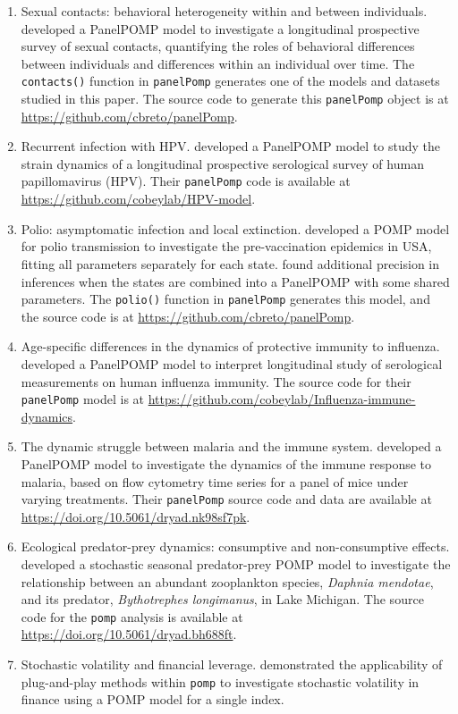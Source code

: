 \documentclass[12pt]{article}\usepackage[]{graphicx}\usepackage[table]{xcolor}
\newcommand\code{\texttt}
\newcommand\panelPomp{\texttt{panelPomp}\xspace}
\newcommand\pomp{\texttt{pomp}\xspace}
\newcommand\example[1]{ \item #1}
\begin{document}
\begin{enumerate}
\example{Sexual contacts: behavioral heterogeneity within and between individuals}.
\citet{romero-severson15} developed a PanelPOMP model to investigate a longitudinal prospective survey of sexual contacts, quantifying the roles of behavioral differences between individuals and differences within an individual over time. The \code{contacts()} function in \panelPomp generates one of the models and datasets studied in this paper. The source code to generate this \code{panelPomp} object is at \url{https://github.com/cbreto/panelPomp}.


\example{Recurrent infection with HPV}.
\citet{ranjeva17} developed a PanelPOMP model to study the strain dynamics of a longitudinal prospective serological survey of human papillomavirus (HPV).
Their \panelPomp code is available at \url{https://github.com/cobeylab/HPV-model}.

\example{Polio: asymptomatic infection and local extinction}.
\citet{martinez-bakker15} developed a POMP model for polio transmission to investigate the pre-vaccination epidemics in USA, fitting all parameters separately for each state.
\citet{breto19} found additional precision in inferences when the states are combined into a PanelPOMP with some shared parameters.
The \code{polio()} function in \panelPomp generates this model, and the source code is at \url{https://github.com/cbreto/panelPomp}.

\example{Age-specific differences in the dynamics of protective immunity to influenza}.
\citet{ranjeva19} developed a PanelPOMP model to interpret longitudinal study of serological measurements on human influenza immunity.
The source code for their \panelPomp model is at \url{https://github.com/cobeylab/Influenza-immune-dynamics}.

\example{The dynamic struggle between malaria and the immune system}.
\citet{wale19} developed a PanelPOMP model to investigate the dynamics of the immune response to malaria, based on flow cytometry time series for a panel of mice under varying treatments. Their \code{panelPomp} source code and data are available at \url{https://doi.org/10.5061/dryad.nk98sf7pk}.

\example{Ecological predator-prey dynamics: consumptive and non-consumptive effects}.
\citet{marino19} developed a stochastic seasonal predator-prey POMP model to investigate the relationship between an abundant zooplankton species, {\it Daphnia mendotae}, and its predator, {\it Bythotrephes longimanus}, in Lake Michigan. The source code for the \code{pomp} analysis is available at \url{https://doi.org/10.5061/dryad.bh688ft}.

\example{Stochastic volatility and financial leverage}.
 \citet{breto14} demonstrated the applicability of plug-and-play methods within \pomp to investigate stochastic volatility in finance using a POMP model for a single index.

\end{enumerate}
\end{document}
